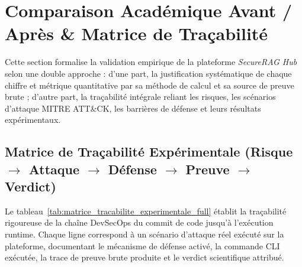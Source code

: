\section{Comparaison Académique Avant / Après \& Matrice de Traçabilité}
\label{sec:comparaison_avant_apres}

Cette section formalise la validation empirique de la plateforme \textit{SecureRAG Hub} selon une double approche : d'une part, la justification systématique de chaque chiffre et métrique quantitative par sa méthode de calcul et sa source de preuve brute ; d'autre part, la traçabilité intégrale reliant les risques, les scénarios d'attaque MITRE ATT\&CK, les barrières de défense et leurs résultats expérimentaux.

\subsection{Matrice de Traçabilité Expérimentale (Risque $\rightarrow$ Attaque $\rightarrow$ Défense $\rightarrow$ Preuve $\rightarrow$ Verdict)}

Le tableau~\ref{tab:matrice_tracabilite_experimentale_full} établit la traçabilité rigoureuse de la chaîne DevSecOps du commit de code jusqu'à l'exécution runtime. Chaque ligne correspond à un scénario d'attaque réel exécuté sur la plateforme, documentant le mécanisme de défense activé, la commande CLI exécutée, la trace de preuve brute produite et le verdict scientifique attribué.

